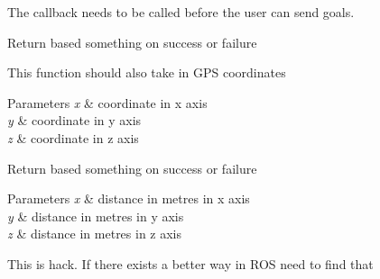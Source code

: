 
\begin{DoxyRefList}
\item[\label{todo__todo000001}%
\hypertarget{todo__todo000001}{}%
Member \hyperlink{classspiri__api_1_1get__state_1_1_staterobot_a015efa1f3a59211063e167ec0cb1fc3b}{spiri\-\_\-api.get\-\_\-state.Staterobot.\-\_\-\-\_\-init\-\_\-\-\_\-} ]The callback needs to be called before the user can send goals. 
\item[\label{todo__todo000002}%
\hypertarget{todo__todo000002}{}%
Member \hyperlink{classspiri__api_1_1get__state_1_1_staterobot_af6d1fe436714134bbd2fb78da0b09835}{spiri\-\_\-api.get\-\_\-state.Staterobot.send\-\_\-goal} ]Return based something on success or failure 

This function should also take in G\-P\-S coordinates 
\begin{DoxyParams}{Parameters}
{\em x} & coordinate in x axis \\
\hline
{\em y} & coordinate in y axis \\
\hline
{\em z} & coordinate in z axis  \\
\hline
\end{DoxyParams}

\item[\label{todo__todo000003}%
\hypertarget{todo__todo000003}{}%
Member \hyperlink{classspiri__api_1_1get__state_1_1_staterobot_abc35e5157bb27bfc35bbfb4aee9df2e5}{spiri\-\_\-api.get\-\_\-state.Staterobot.send\-\_\-goal\-\_\-relative\-\_\-threading} ]Return based something on success or failure 
\begin{DoxyParams}{Parameters}
{\em x} & distance in metres in x axis \\
\hline
{\em y} & distance in metres in y axis \\
\hline
{\em z} & distance in metres in z axis  \\
\hline
\end{DoxyParams}

\item[\label{todo__todo000004}%
\hypertarget{todo__todo000004}{}%
Member \hyperlink{class_staterobot_addfc245d53239eed664812a50a916428}{Staterobot\-:\-:send\-\_\-vel} (float x, float y, float z)]This is hack. If there exists a better way in R\-O\-S need to find that 
\end{DoxyRefList}